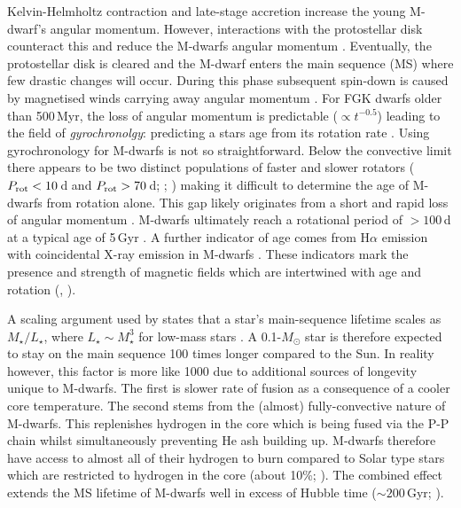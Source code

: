 Kelvin-Helmholtz contraction and late-stage accretion increase the young M-dwarf's angular momentum. However, interactions with the protostellar disk counteract this and reduce the M-dwarfs angular momentum \citep{2005ApJ...632L.135M}.  Eventually, the protostellar disk is cleared and the M-dwarf enters the main sequence (MS) where few drastic changes will occur. During this phase subsequent spin-down is caused by magnetised winds carrying away angular momentum \citep{2003ApJ...586..464B}. For FGK dwarfs older than 500\,Myr, the loss of angular momentum is predictable ($\propto t^{-0.5}$) leading to the field of \textit{gyrochronolgy}: predicting a stars age from its rotation rate \citep{2008ApJ...687.1264M}. Using gyrochronology for M-dwarfs is not so straightforward. Below the convective limit there appears to be two distinct populations of faster and slower rotators ($P_{\rm rot} < 10$\,d and $P_{\rm rot} > 70$\,d; \citealt{2011ApJ...727...56I}; \citealt{2016ApJ...821...93N}) making it difficult to determine the age of M-dwarfs from rotation alone. This gap likely originates from a short and rapid loss of angular momentum \citep{2011ApJ...727...56I}. M-dwarfs ultimately reach a rotational period of $> 100$\,d at a typical age of 5\,Gyr \citep{2016ApJ...821...93N}. A further indicator of age comes from H$\alpha$ emission with coincidental X-ray emission in M-dwarfs \citep{2007AJ....134.2398C}. These indicators mark the presence and strength of magnetic fields which are intertwined with age and rotation (\citealt{2006AJ....132.2507W}, \citealt{2008AJ....135..785W}).

A scaling argument used by \citet{2016PhR...663....1S} states that a star's main-sequence lifetime scales as $M_\star / L_\star$, where $L_\star \sim M_\star^3$ for low-mass stars \citep{2009itss.book.....P}. A 0.1-$M_\odot$ star is therefore expected to stay on the main sequence 100 times longer compared to the Sun. In reality however, this factor is more like 1000 due to additional sources of longevity unique to M-dwarfs. The first is slower rate of fusion as a consequence of a cooler core temperature. The second stems from the (almost) fully-convective nature of M-dwarfs. This replenishes hydrogen in the core which is being fused via the P-P chain whilst simultaneously preventing He ash building up. M-dwarfs therefore have access to almost all of their hydrogen to burn \citep{2004RMxAC..22...46A} compared to Solar type stars which are restricted to hydrogen in the core (about 10\%; \citealt{2016PhR...663....1S}). The combined effect extends the MS lifetime of M-dwarfs well in excess of Hubble time ($\sim 200$\,Gyr; \citealt{1998A&A...337..403B}).


